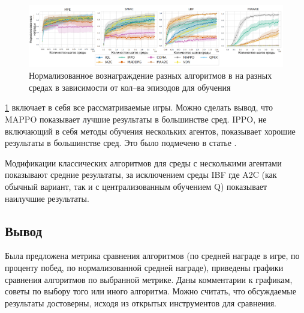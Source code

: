 
\begin{figure}[H]
	\begin{center}
	\includegraphics[pages=-, width=140mm]{./inc/img/comp_big.png}
	\caption{Нормализованное вознаграждение разных алгоритмов в на разных средах в зависимости от кол--ва эпизодов для обучения}
	\label{fig:mappo_perf}
\end{center}
\end{figure}

\ref{fig:mappo_perf} \cite{DBLP:journals/corr/abs-2103-01955} включает в себя все рассматриваемые игры. Можно сделать вывод, что MAPPO показывает лучшие результаты в большинстве сред.
IPPO, не включающий в себя методы обучения нескольких агентов, показывает хорошие результаты в большинстве сред. Это было подмечено в статье \cite{DBLP:journals/corr/abs-2103-01955}.

Модификации классических алгоритмов для среды с несколькими агентами показывают средние результаты, за исключением среды IBF где A2C (как обычный вариант, так и с централизованным обучением Q) показывает наилучшие результаты. 

\subsection*{Вывод}

Была предложена метрика сравнения алгоритмов (по средней награде в игре, по проценту побед, по нормализованной средней награде), приведены графики сравнения алгоритмов по выбранной метрике. Даны комментарии к графикам, советы по выбору того или иного алгоритма.
Можно считать, что обсуждаемые результаты достоверны, исходя из открытых инструментов для сравнения.

